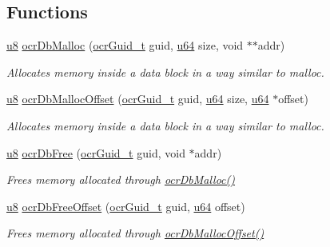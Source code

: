 \subsection*{Functions}
\begin{DoxyCompactItemize}
\item 
\hyperlink{group__OCRTypesGeneral_ga92c50087ca0e64fa93fc59402c55f8ca}{u8} \hyperlink{group__OCRDataBlock_ga8aa85542741b3f9e81ce1b48ee72b711}{ocr\-Db\-Malloc} (\hyperlink{group__OCRTypesGeneral_gacde3883d1ce245c051133c2c3aa82fc8}{ocr\-Guid\-\_\-t} guid, \hyperlink{group__OCRTypesGeneral_ga3f7e2bcbb0b4c338f3c4f6c937cd4234}{u64} size, void $\ast$$\ast$addr)
\begin{DoxyCompactList}\small\item\em Allocates memory {\itshape inside} a data block in a way similar to malloc. \end{DoxyCompactList}

\item 
\hyperlink{group__OCRTypesGeneral_ga92c50087ca0e64fa93fc59402c55f8ca}{u8} \hyperlink{group__OCRDataBlock_ga9fdb9d09d5e7875453870e7c52e524ee}{ocr\-Db\-Malloc\-Offset} (\hyperlink{group__OCRTypesGeneral_gacde3883d1ce245c051133c2c3aa82fc8}{ocr\-Guid\-\_\-t} guid, \hyperlink{group__OCRTypesGeneral_ga3f7e2bcbb0b4c338f3c4f6c937cd4234}{u64} size, \hyperlink{group__OCRTypesGeneral_ga3f7e2bcbb0b4c338f3c4f6c937cd4234}{u64} $\ast$offset)
\begin{DoxyCompactList}\small\item\em Allocates memory {\itshape inside} a data block in a way similar to malloc. \end{DoxyCompactList}

\item 
\hyperlink{group__OCRTypesGeneral_ga92c50087ca0e64fa93fc59402c55f8ca}{u8} \hyperlink{group__OCRDataBlock_ga41a15d63d118ebae3f13e86284bd929c}{ocr\-Db\-Free} (\hyperlink{group__OCRTypesGeneral_gacde3883d1ce245c051133c2c3aa82fc8}{ocr\-Guid\-\_\-t} guid, void $\ast$addr)
\begin{DoxyCompactList}\small\item\em Frees memory allocated through \hyperlink{group__OCRDataBlock_ga8aa85542741b3f9e81ce1b48ee72b711}{ocr\-Db\-Malloc()} \end{DoxyCompactList}

\item 
\hyperlink{group__OCRTypesGeneral_ga92c50087ca0e64fa93fc59402c55f8ca}{u8} \hyperlink{group__OCRDataBlock_gad937f3dca78f1f728b9ab49f48b2da44}{ocr\-Db\-Free\-Offset} (\hyperlink{group__OCRTypesGeneral_gacde3883d1ce245c051133c2c3aa82fc8}{ocr\-Guid\-\_\-t} guid, \hyperlink{group__OCRTypesGeneral_ga3f7e2bcbb0b4c338f3c4f6c937cd4234}{u64} offset)
\begin{DoxyCompactList}\small\item\em Frees memory allocated through \hyperlink{group__OCRDataBlock_ga9fdb9d09d5e7875453870e7c52e524ee}{ocr\-Db\-Malloc\-Offset()} \end{DoxyCompactList}


\end{DoxyCompactItemize}
